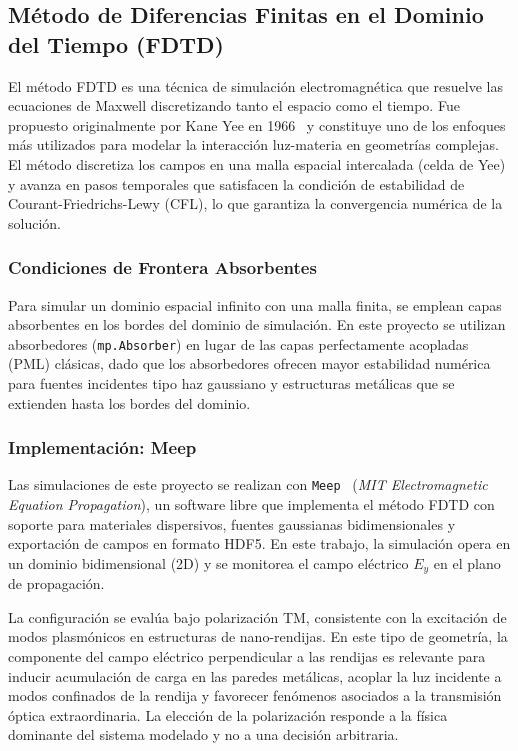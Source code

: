 \subsection{Método de Diferencias Finitas en el Dominio del Tiempo (FDTD)}\label{subsec:fdtd}

El método FDTD es una técnica de simulación electromagnética que resuelve las ecuaciones de Maxwell discretizando tanto el espacio como el tiempo. Fue propuesto originalmente por Kane Yee en 1966~\cite{yee1966} y constituye uno de los enfoques más utilizados para modelar la interacción luz-materia en geometrías complejas. El método discretiza los campos en una malla espacial intercalada (celda de Yee) y avanza en pasos temporales que satisfacen la condición de estabilidad de Courant-Friedrichs-Lewy (CFL), lo que garantiza la convergencia numérica de la solución.

\subsubsection{Condiciones de Frontera Absorbentes}

Para simular un dominio espacial infinito con una malla finita, se emplean capas absorbentes en los bordes del dominio de simulación. En este proyecto se utilizan absorbedores (\texttt{mp.Absorber}) en lugar de las capas perfectamente acopladas (PML) clásicas, dado que los absorbedores ofrecen mayor estabilidad numérica para fuentes incidentes tipo haz gaussiano y estructuras metálicas que se extienden hasta los bordes del dominio.

\subsubsection{Implementación: Meep}

Las simulaciones de este proyecto se realizan con \texttt{Meep}~\cite{oskooi2010meep} (\textit{MIT Electromagnetic Equation Propagation}), un software libre que implementa el método FDTD con soporte para materiales dispersivos, fuentes gaussianas bidimensionales y exportación de campos en formato HDF5. En este trabajo, la simulación opera en un dominio bidimensional (2D) y se monitorea el campo eléctrico $E_y$ en el plano de propagación.

La configuración se evalúa bajo polarización TM, consistente con la excitación de modos plasmónicos en estructuras de nano-rendijas. En este tipo de geometría, la componente del campo eléctrico perpendicular a las rendijas es relevante para inducir acumulación de carga en las paredes metálicas, acoplar la luz incidente a modos confinados de la rendija y favorecer fenómenos asociados a la transmisión óptica extraordinaria. La elección de la polarización responde a la física dominante del sistema modelado y no a una decisión arbitraria.

